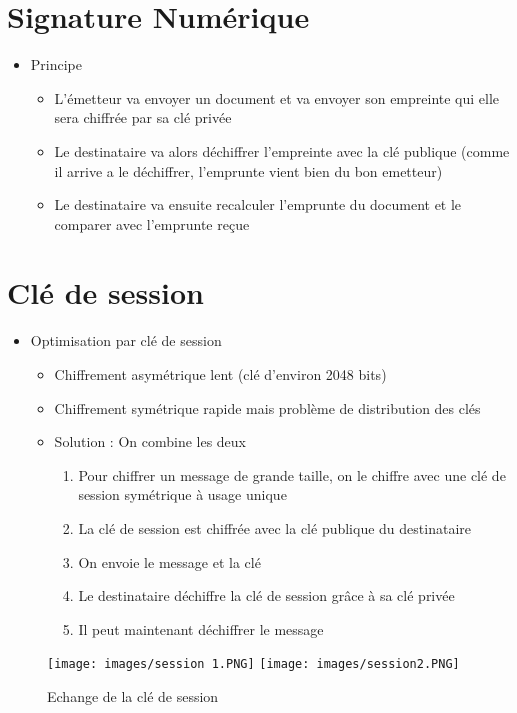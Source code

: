 \documentclass[a4paper]{article}
\begin{document}
\section{Signature Numérique}
\begin{itemize}[label=\textbullet, font=\Large]
    \item Principe
    \begin{itemize}[label=, font=\scriptsize]
        \item L'émetteur va envoyer un document et va envoyer son empreinte qui elle sera chiffrée par sa clé privée
        \item Le destinataire va alors déchiffrer l'empreinte avec la clé publique (comme il arrive a le déchiffrer, l'emprunte vient bien du bon emetteur)
        \item Le destinataire va ensuite recalculer l'emprunte du document et le comparer avec l'emprunte reçue
    \end{itemize}
\end{itemize}

\section{Clé de session}
\begin{itemize}[label=\textbullet, font=\Large]
    \item Optimisation par clé de session
    \begin{itemize}[label=, font=\scriptsize]
        \item Chiffrement asymétrique lent (clé d'environ 2048 bits)
        \item Chiffrement symétrique rapide mais problème de distribution des clés
        \item Solution : On combine les deux
        \begin{enumerate}
            \item Pour chiffrer un message de grande taille, on le chiffre avec une clé de session symétrique à usage unique
            \item La clé de session est chiffrée avec la clé publique du destinataire
            \item On envoie le message et la clé
            \item Le destinataire déchiffre la clé de session grâce à sa clé privée
            \item Il peut maintenant déchiffrer le message
            
        \end{enumerate}
    \end{itemize}
\end{itemize}
\begin{figure}[H]
    \centering
    \texttt{[image: images/session 1.PNG]}
    \texttt{[image: images/session2.PNG]}
    \caption{Echange de la clé de session}
\end{figure}
\end{document}
